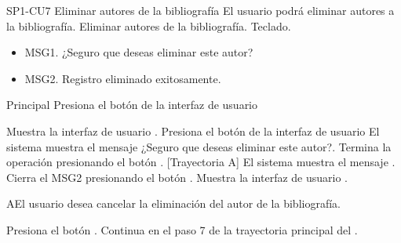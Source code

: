 \begin{UseCase} {SP1-CU7} {Eliminar autores de la bibliografía} {El usuario podrá eliminar autores a la bibliografía.}
         {Eliminar autores de la bibliografía.}
         {}
         {Teclado.}
         {
            \begin{itemize}
                \item MSG1. ¿Seguro que deseas eliminar este autor?
                \item MSG2. Registro eliminado exitosamente.
            \end{itemize}
        }
\end{UseCase}

\begin{UCtrayectoria}{Principal}
\UCpaso[\UCactor] Presiona el botón  de la interfaz de usuario 


\UCpaso Muestra la interfaz de usuario .
\UCpaso[\UCactor] Presiona el botón  de la interfaz de usuario 
\UCpaso El sistema muestra el mensaje  {¿Seguro que deseas eliminar este autor?}.
\UCpaso[\UCactor] Termina la operación presionando el botón . [Trayectoria A]
\UCpaso El sistema muestra el mensaje .
\UCpaso[\UCactor] Cierra el MSG2 presionando el botón .
\UCpaso Muestra la interfaz de usuario .
\end{UCtrayectoria}


\begin{UCtrayectoriaA}{A}{El usuario desea cancelar la eliminación del autor de la bibliografía.}

\UCpaso[\UCactor] Presiona el botón .
\UCpaso Continua en el paso 7 de la trayectoria principal del .

\end{UCtrayectoriaA}